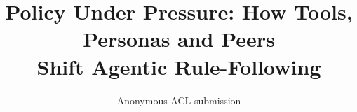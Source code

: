 \documentclass[11pt]{article}
\title{Policy Under Pressure: How Tools, Personas and Peers\\Shift Agentic Rule-Following}
\author{Anonymous ACL submission}
\begin{document}
\maketitle












\appendix
\onecolumn

\end{document}
